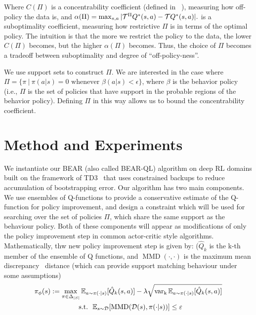 \documentclass{article}
\begin{document}
Where $C(\Pi)$ is a concentrability coefficient (defined in ~\citep{munos2005erroravi}), measuring how off-policy the data is, and $\alpha(\Pi)= \max_{s,a} |\mathcal{T}^\Pi Q^*(s, a) - \mathcal{T} Q^*(s, a)|.$ is a suboptimality coefficient, measuring how restrictive $\Pi$ is in terms of the optimal policy.
The intuition is that the more we restrict the policy to the data, the lower $C(\Pi)$ becomes, but the higher $\alpha(\Pi)$ becomes. Thus, the choice of $\Pi$ becomes a tradeoff between suboptimality and degree of ``off-policy-ness''.

We use support sets to construct $\Pi$. We are interested in the case where $\Pi = \{ \pi ~|~ \pi( a | s) = 0 \text{ whenever } \beta( a | s) < \epsilon \}$, where $\beta$ is the behavior policy (i.e., $\Pi$ is the set of policies that have support in the probable regions of the behavior policy). Defining $\Pi$ in this way allows us to bound the concentrability coefficient. 

\section{Method and Experiments}
We instantiate our BEAR (also called BEAR-QL) algorithm on deep RL domains built on the framework of TD3~\cite{fujimoto18addressing} that uses constrained backups to reduce accumulation of bootstrapping error. Our algorithm has two main components. We use ensembles of Q-functions to provide a conservative estimate of the Q-function for policy improvement, and design a constraint which will be used for searching over the set of policies $\Pi$, which share the same support as the behaviour policy. Both of these components will appear as modifications of only the policy improvement step in common actor-critic style algorithms. Mathematically, thw new policy improvement step is given by: ($\hat{Q}_k$ is the k-th member of the ensemble of Q functions, and $\operatorname{MMD}(\cdot, \cdot)$ is the maximum mean discrepancy~\cite{gretton2012kernel} distance (which can provide support matching behaviour under some assumptions)   
\vspace{-5pt}
\begin{multline}
    \label{eqn:policy_update}
   \pi_\phi(s) := \max_{\pi \in \Delta_{|S|}} \mathbb{E}_{a \sim \pi(\cdot|s)} [\hat{Q}_{k}(s, a)] - \lambda \sqrt{ \operatorname{var_k}\mathbb{E}_{a \sim \pi(\cdot |s) }[\hat{Q}_k(s, a)]}\\
   \text{~~s.t.~~} \mathbb{E}_{s \sim \mathcal{D}} [\operatorname{MMD}(\mathcal{D}(s), \pi(\cdot|s))] \leq \varepsilon
\end{multline}
\end{document}
